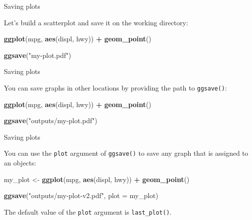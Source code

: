 \documentclass[ignorenonframetext,]{beamer}
\newenvironment{Shaded}{\begin{snugshade}}{\end{snugshade}}
\newcommand{\DataTypeTok}[1]{\textcolor[rgb]{0.13,0.29,0.53}{#1}}
\newcommand{\KeywordTok}[1]{\textcolor[rgb]{0.13,0.29,0.53}{\textbf{#1}}}
\newcommand{\NormalTok}[1]{#1}
\newcommand{\OperatorTok}[1]{\textcolor[rgb]{0.81,0.36,0.00}{\textbf{#1}}}
\newcommand{\StringTok}[1]{\textcolor[rgb]{0.31,0.60,0.02}{#1}}
\begin{document}
\begin{frame}[fragile]{Saving plots}
\protect\hypertarget{saving-plots}{}

Let's build a scatterplot and save it on the working directory:

\begin{Shaded}
\begin{Highlighting}[]
\KeywordTok{ggplot}\NormalTok{(mpg, }\KeywordTok{aes}\NormalTok{(displ, hwy)) }\OperatorTok{+}
\StringTok{  }\KeywordTok{geom_point}\NormalTok{()}

\KeywordTok{ggsave}\NormalTok{(}\StringTok{"my-plot.pdf"}\NormalTok{)}
\end{Highlighting}
\end{Shaded}

\end{frame}

\begin{frame}[fragile]{Saving plots}
\protect\hypertarget{saving-plots-1}{}

You can save graphs in other locations by providing the path to
\texttt{ggsave()}:

\begin{Shaded}
\begin{Highlighting}[]
\KeywordTok{ggplot}\NormalTok{(mpg, }\KeywordTok{aes}\NormalTok{(displ, hwy)) }\OperatorTok{+}
\StringTok{  }\KeywordTok{geom_point}\NormalTok{()}

\KeywordTok{ggsave}\NormalTok{(}\StringTok{"outputs/my-plot.pdf"}\NormalTok{)}
\end{Highlighting}
\end{Shaded}

\end{frame}

\begin{frame}[fragile]{Saving plots}
\protect\hypertarget{saving-plots-2}{}

You can use the \texttt{plot} argument of \texttt{ggsave()} to save any
graph that is assigned to an objects:

\begin{Shaded}
\begin{Highlighting}[]
\NormalTok{my_plot <-}\StringTok{ }\KeywordTok{ggplot}\NormalTok{(mpg, }\KeywordTok{aes}\NormalTok{(displ, hwy)) }\OperatorTok{+}
\StringTok{  }\KeywordTok{geom_point}\NormalTok{()}

\KeywordTok{ggsave}\NormalTok{(}\StringTok{"outputs/my-plot-v2.pdf"}\NormalTok{, }\DataTypeTok{plot =}\NormalTok{ my_plot)}
\end{Highlighting}
\end{Shaded}

The default value of the \texttt{plot} argument is
\texttt{last\_plot()}.

\end{frame}
\end{document}
